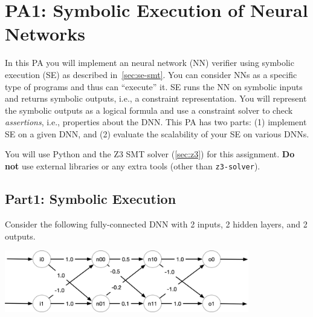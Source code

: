 \section{PA1: Symbolic Execution of Neural Networks}\label{sec:pa1}

In this PA you will implement an neural network (NN) verifier using symbolic execution (SE) as described in~\autoref{sec:se-smt}. You can consider NNs as a specific type of programs and thus can ``execute'' it.  SE runs the NN on symbolic inputs and returns symbolic outputs, i.e., a constraint representation.  You will represent the symbolic outputs as a logical formula and use a constraint solver to check \emph{assertions}, i.e., properties about the DNN. This PA has two parts: (1) implement SE on a given DNN, and (2) evaluate the scalability of your SE on various DNNs.

You will use Python and the Z3 SMT solver (\autoref{sec:z3}) for this assignment. \textbf{Do not} use external libraries or any extra tools (other than \texttt{z3-solver}).

\subsection{Part1: Symbolic Execution}

Consider the following fully-connected DNN with 2 inputs, 2 hidden layers, and 2 outputs.

\begin{center}
\includegraphics[width=0.8\textwidth]{figure/dnn1.png}
\end{center}


